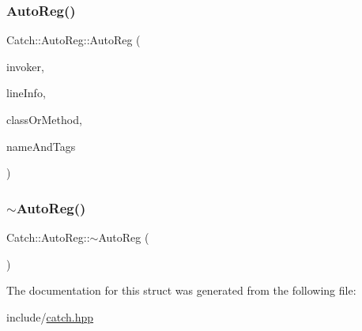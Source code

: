 \subsubsection{\texorpdfstring{Auto\+Reg()}{AutoReg()}}
{\footnotesize\ttfamily Catch\+::\+Auto\+Reg\+::\+Auto\+Reg (\begin{DoxyParamCaption}\item[{\mbox{\hyperlink{structCatch_1_1ITestInvoker}{I\+Test\+Invoker}} $\ast$}]{invoker,  }\item[{\mbox{\hyperlink{structCatch_1_1SourceLineInfo}{Source\+Line\+Info}} const \&}]{line\+Info,  }\item[{\mbox{\hyperlink{classCatch_1_1StringRef}{String\+Ref}}}]{class\+Or\+Method,  }\item[{\mbox{\hyperlink{structCatch_1_1NameAndTags}{Name\+And\+Tags}} const \&}]{name\+And\+Tags }\end{DoxyParamCaption})\hspace{0.3cm}{\ttfamily [noexcept]}}

\mbox{\label{structCatch_1_1AutoReg_a3cdb53f1e5ff115310f3372bebe198f1}} 
\subsubsection{\texorpdfstring{$\sim$\+Auto\+Reg()}{~AutoReg()}}
{\footnotesize\ttfamily Catch\+::\+Auto\+Reg\+::$\sim$\+Auto\+Reg (\begin{DoxyParamCaption}{ }\end{DoxyParamCaption})}



The documentation for this struct was generated from the following file\+:\begin{DoxyCompactItemize}
\item 
include/\mbox{\hyperlink{catch_8hpp}{catch.\+hpp}}\end{DoxyCompactItemize}
